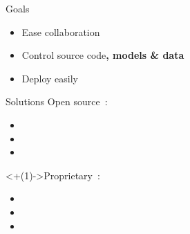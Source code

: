 \begin{frame}{Goals}
  \begin{itemize}[<+->]
    \item Ease collaboration
    \item Control source code\textbf{, models \& data}
    \item Deploy easily
  \end{itemize}
\end{frame}

\begin{frame}{Solutions}
  Open source~:
  \begin{itemize}[<+(1)->]
    \item {}
    \item {}
    \item {}
  \end{itemize}

  \onslide<+(1)->{Proprietary~:}
  \begin{itemize}[<+(1)->]
    \item {}
    \item {}
    \item {}
  \end{itemize}
\end{frame}

